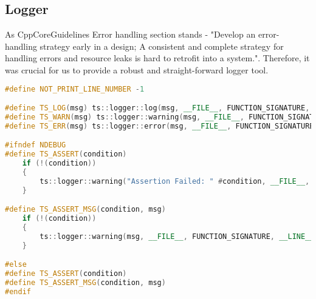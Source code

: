\newpage

\subsection{Logger}
\label{sec:logger}
As CppCoreGuidelines \cite{CppCoreGuidelines} Error handling section stands - "Develop an error-handling strategy early in a design; A consistent and complete strategy for handling errors and resource leaks is hard to retrofit into a system.". Therefore, it was crucial for us to provide a robust and straight-forward logger tool.
\begin{lstlisting}[language=c++, caption=Logger macros (./engine/include/tsengine/logger.h)]
#define NOT_PRINT_LINE_NUMBER -1

#define TS_LOG(msg) ts::logger::log(msg, __FILE__, FUNCTION_SIGNATURE, __LINE__)
#define TS_WARN(msg) ts::logger::warning(msg, __FILE__, FUNCTION_SIGNATURE, __LINE__)
#define TS_ERR(msg) ts::logger::error(msg, __FILE__, FUNCTION_SIGNATURE, __LINE__)

#ifndef NDEBUG
#define TS_ASSERT(condition)                                                                                \
    if (!(condition))                                                                                       \
    {                                                                                                       \
        ts::logger::warning("Assertion Failed: " #condition, __FILE__, FUNCTION_SIGNATURE, __LINE__, true); \
    }

#define TS_ASSERT_MSG(condition, msg)                                           \
    if (!(condition))                                                           \
    {                                                                           \
        ts::logger::warning(msg, __FILE__, FUNCTION_SIGNATURE, __LINE__, true); \
    }

#else
#define TS_ASSERT(condition)
#define TS_ASSERT_MSG(condition, msg)
#endif
\end{lstlisting}

\newpage

